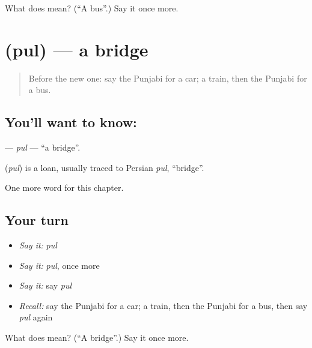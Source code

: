 \begin{tcolorbox}[breakable,colback=teal!4,colframe=teal!35!black,title={Before you move on}]
What does  mean? (\textquotedblleft{}A bus\textquotedblright{}.) Say it once more.
\end{tcolorbox}
\section[\texorpdfstring{\pa{ਪੁਲ} (pul)}{ਪੁਲ (pul)}]{ (pul) — a bridge}

\label{lesson:PA-C91-pul}



\begin{quote}
Before the new one: say the Punjabi for a car; a train, then the Punjabi for a bus.
\end{quote}

\subsection*{You'll want to know: }
\textbf{} — \emph{pul} — \textquotedblleft{}a bridge\textquotedblright{}.

\begin{cousinweb}
\textbf{} (\emph{pul}) is a loan, usually traced to Persian \emph{pul}, \textquotedblleft{}bridge\textquotedblright{}.
\end{cousinweb}

\begin{grammarlens}[title={What you've built}]
One more word for this chapter.
\end{grammarlens}

\subsection*{Your turn}
\begin{itemize}
\raggedright
  \item \emph{Say it:} \emph{pul}
  \item \emph{Say it:} \emph{pul}, once more
  \item \emph{Say it:} say \emph{pul}
  \item \emph{Recall:} say the Punjabi for a car; a train, then the Punjabi for a bus, then say \emph{pul} again
\end{itemize}

\begin{tcolorbox}[breakable,colback=teal!4,colframe=teal!35!black,title={Before you move on}]
What does  mean? (\textquotedblleft{}A bridge\textquotedblright{}.) Say it once more.
\end{tcolorbox}
